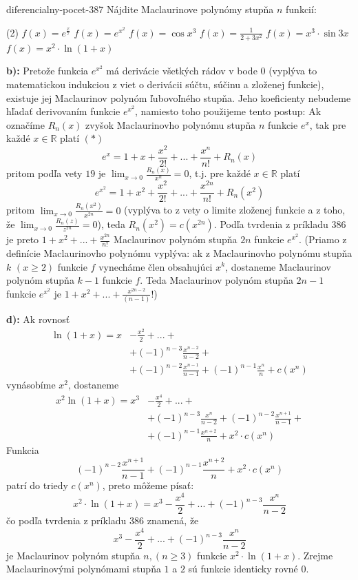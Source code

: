 \begin{defproblem}{diferencialny-pocet-387}
Nájdite Maclaurinove polynómy stupňa $n$ funkcií:
\begin{tasks}(2)
  \task $f(x)=e^{\frac{x}{7}}$
  \task $f(x)=e^{x^2}$
  \task $f(x)=\cos x^3$
  \task $f(x)=\frac{1}{2+3x^2}$
  \task $f(x)=x^3\cdot\sin 3x$
  \task $f(x)=x^2\cdot\ln (1+x)$
\end{tasks}

\begin{solution}
  \textbf{b):}
  Pretože funkcia $e^{x^2}$ má derivácie všetkých rádov v bode $0$ (vyplýva to
  matematickou indukciou z viet o derivácii súčtu, súčinu a zloženej funkcie),
  existuje jej Maclaurinov polynóm ľubovoľného stupňa. Jeho koeficienty nebudeme
  hľadať derivovaním funkcie $e^{x^2}$, namiesto toho použijeme tento postup: Ak
  označíme $R_n(x)$ zvyšok Maclaurinovho polynómu stupňa $n$ funkcie $e^x$, tak
  pre každé $x\in\mathbb{R}$ platí $(*)$
  \[
    e^x=1+x+\frac{x^2}{2!}+...+\frac{x^n}{n!}+R_n(x)
  \]
  pritom podľa vety $19$ je $\lim_{x\rightarrow 0}\frac{R_n(x)}{x^n}=0$, t.j.
  pre každé $x\in\mathbb{R}$ platí
  \[
    e^{x^2}=1+x^2+\frac{x^2}{2!}+...+\frac{x^{2n}}{n!}+R_n(x^2)
  \]
  pritom $\lim_{x\rightarrow 0}\frac{R_n(x^2)}{x^{2n}}=0$ (vyplýva to z vety o
  limite zloženej funkcie a z toho, že $\lim_{x\rightarrow
  0}\frac{R_n(z)}{z^{2n}}=0$), teda $R_n(x^2)=c(x^{2n}).$ Podľa tvrdenia z
  príkladu $386$ je preto $1+x^2+...+\frac{x^{2n}}{n!}$ Maclaurinov polynóm
  stupňa $2n$ funkcie $e^{x^2}$. (Priamo z definície Maclaurinovho polynómu
  vyplýva: ak z Maclaurinovho polynómu stupňa $k$ $(x\geq 2)$ funkcie $f$
  vynecháme člen obsahujúci $x^k$, dostaneme Maclaurinov polynóm stupňa $k-1$
  funkcie $f$. Teda Maclaurinov polynóm stupňa $2n-1$ funkcie $e^{x^2}$ je
  $1+x^2+...+\frac{x^{2n-2}}{(n-1)}$!)

  \textbf{d):}
  Ak rovnosť
  \begin{align*}
    \ln (1+x)
      = x &- \frac{x^2}{2} + ... + \\
          &+ (-1)^{n-3}\frac{x^{n-2}}{n-2} + \\
          &+ (-1)^{n-2}\frac{x^{n-1}}{n-1}+(-1)^{n-1}\frac{x^n}{n}+c(x^n)
  \end{align*}
  vynásobíme $x^2$, dostaneme
  \begin{align*}
    x^2\ln (1+x)
      = x^3 &- \frac{x^4}{2} + ... + \\
        & + (-1)^{n-3}\frac{x^{n}}{n-2}
          + (-1)^{n-2}\frac{x^{n+1}}{n-1} + \\
        & +(-1)^{n-1}\frac{x^{n+2}}{n}+x^2\cdot c(x^n)
  \end{align*}
  Funkcia
  \[
    (-1)^{n-2}\frac{x^{n+1}}{n-1}+(-1)^{n-1}\frac{x^{n+2}}{n}+x^2\cdot c(x^n)
  \]
  patrí do triedy $c(x^n)$, preto môžeme písať:
  \[
    x^2\cdot\ln (1+x)=x^3-\frac{x^4}{2}+...+(-1)^{n-3}\frac{x^n}{n-2}
  \]
  čo podľa tvrdenia z príkladu $386$ znamená, že
  \[
    x^3-\frac{x^4}{2}+...+(-1)^{n-3}\frac{x^n}{n-2}
  \]
  je Maclaurinov polynóm stupňa $n,(n\geq 3)$ funkcie $x^2\cdot\ln (1+x)$.
  Zrejme Maclaurinovými polynómami stupňa $1$ a $2$ sú funkcie identicky rovné
  $0$.
\end{solution}
\end{defproblem}

